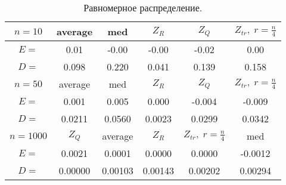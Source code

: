 \documentclass[a4]{article}
\begin{document}
		\begin{table}[h]
			\caption{ Равномерное распределение.}
			\begin{center}
				\begin{tabular}{|c|c|c|c|c|c|}
					\hline
					$n = 10$  & average & med & $Z_R$ & $Z_Q$ & $Z_{tr},\;r=\frac{n}{4}$\\ \hline
					$E =$       &	0.01  &       -0.00 &       -0.00       & -0.02      &  0.00\\ \hline  
					$D =$       &	0.098     &    0.220 &        0.041      &   0.139       &  0.158  \\ \hline
					
					$n = 50$  & average & med & $Z_R$ & $Z_Q$ & $Z_{tr},\;r=\frac{n}{4}$\\ \hline
					$E =$       & 0.001 &        0.005      &   0.000     &    -0.004 &       -0.009    \\ \hline
					$D =$       &	0.0211      &   0.0560  &       0.0023      &   0.0299       &  0.0342\\ \hline
					
					$n = 1000$ & $Z_Q$ & average  & $Z_R$  & $Z_{tr},\;r=\frac{n}{4}$& med\\ \hline
					$E =$   &  0.0021  &  	0.0001     &        0.0000              &  0.0000&     -0.0012\\ \hline
					$D =$   &     0.00000 &   	0.00103                &   0.00143       &  0.00202 &   0.00294 \\
					\hline
				\end{tabular}
			\end{center}
		\end{table}
		
\end{document}
